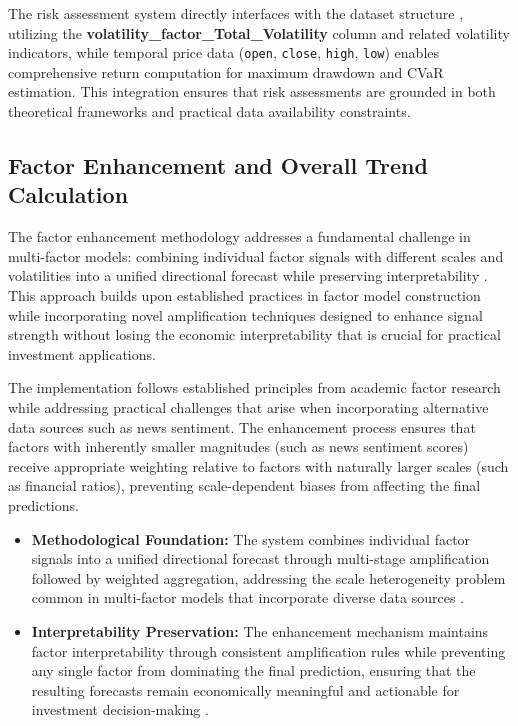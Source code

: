 \documentclass[3p,times,procedia]{elsarticle}
\begin{document}
The risk assessment system directly interfaces with the dataset structure \cite{FinReportDataset2025}, utilizing the \textbf{volatility\_factor\_Total\_Volatility} column and related volatility indicators, while temporal price data (\texttt{open}, \texttt{close}, \texttt{high}, \texttt{low}) enables comprehensive return computation for maximum drawdown and CVaR estimation. This integration ensures that risk assessments are grounded in both theoretical frameworks and practical data availability constraints.

\subsection{{Factor Enhancement and Overall Trend Calculation}}

The factor enhancement methodology addresses a fundamental challenge in multi-factor models: combining individual factor signals with different scales and volatilities into a unified directional forecast while preserving interpretability \cite{Harvey2016,Carhart1997}. This approach builds upon established practices in factor model construction while incorporating novel amplification techniques designed to enhance signal strength without losing the economic interpretability that is crucial for practical investment applications.

The implementation follows established principles from academic factor research \cite{FAMA1993} while addressing practical challenges that arise when incorporating alternative data sources such as news sentiment. The enhancement process ensures that factors with inherently smaller magnitudes (such as news sentiment scores) receive appropriate weighting relative to factors with naturally larger scales (such as financial ratios), preventing scale-dependent biases from affecting the final predictions.

\begin{itemize}
    \item \textbf{Methodological Foundation:} The system combines individual factor signals into a unified directional forecast through multi-stage amplification followed by weighted aggregation, addressing the scale heterogeneity problem common in multi-factor models that incorporate diverse data sources \cite{Harvey2016}.
    \item \textbf{Interpretability Preservation:} The enhancement mechanism maintains factor interpretability through consistent amplification rules while preventing any single factor from dominating the final prediction, ensuring that the resulting forecasts remain economically meaningful and actionable for investment decision-making \cite{Ribeiro2016}.
\end{itemize}
\end{document}
